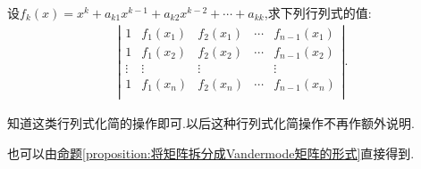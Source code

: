 \documentclass[../../main.tex]{subfiles}%
\begin{document}
\begin{corollary}\label{corollary:多项式行列式与Vandermode行列式相关}
设$f_k\left( x \right) =x^k+a_{k1}x^{k-1}+a_{k2}x^{k-2}+\cdots +a_{kk}
$,求下列行列式的值:
\begin{align*}
\left| \begin{matrix}
1&		f_1(x_1)&		f_2(x_1)&		\cdots&		f_{n-1}(x_1)\\
1&		f_1(x_2)&		f_2(x_2)&		\cdots&		f_{n-1}(x_2)\\
\vdots&		\vdots&		\vdots&		&		\vdots\\
1&		f_1(x_n)&		f_2(x_n)&		\cdots&		f_{n-1}(x_n)\\
\end{matrix} \right|.
\end{align*}
\end{corollary}
\begin{note}
知道这类行列式化简的操作即可.以后这种行列式化简操作不再作额外说明.
\end{note}
\begin{remark}
也可以由\hyperref[proposition:将矩阵拆分成Vandermode矩阵的形式]{命题\ref{proposition:将矩阵拆分成Vandermode矩阵的形式}}直接得到.
\end{remark}
\end{document}
